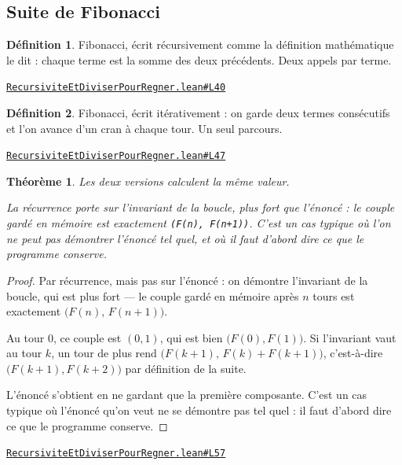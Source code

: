 \documentclass[11pt,a4paper]{article}
\theoremstyle{definition}
\newtheorem{definition}{Définition}
\theoremstyle{plain}
\newtheorem{theoreme}{Théorème}
\newcommand{\source}[2]{\par\smallskip\noindent\hfill{\footnotesize\href{#1}{\texttt{#2}}}\par\smallskip}
\begin{document}
\subsection{Suite de Fibonacci}

\begin{definition}
Fibonacci, écrit récursivement comme la définition mathématique le dit : chaque
terme est la somme des deux précédents. Deux appels par terme.
\end{definition}
\source{https://github.com/Commutator-IO/learn-lean/blob/main/courses/02-lycee/11-informatique-nsi/RecursiviteEtDiviserPourRegner.lean\#L40}{RecursiviteEtDiviserPourRegner.lean\#L40}

\begin{definition}
Fibonacci, écrit itérativement : on garde deux termes consécutifs et l'on avance
d'un cran à chaque tour. Un seul parcours.
\end{definition}
\source{https://github.com/Commutator-IO/learn-lean/blob/main/courses/02-lycee/11-informatique-nsi/RecursiviteEtDiviserPourRegner.lean\#L47}{RecursiviteEtDiviserPourRegner.lean\#L47}

\begin{theoreme}
Les deux versions calculent la même valeur.

La récurrence porte sur l'invariant de la boucle, plus fort que l'énoncé : le couple
gardé en mémoire est exactement \texttt{(F(n), F(n+1))}. C'est un cas typique où l'on ne
peut pas démontrer l'énoncé tel quel, et où il faut d'abord dire ce que le programme
conserve.
\end{theoreme}
\begin{proof}
Par récurrence, mais pas sur l'énoncé : on démontre l'invariant de la boucle, qui est
plus fort — le couple gardé en mémoire après \(n\) tours est exactement
\(\bigl(F(n),\, F(n+1)\bigr)\).

Au tour \(0\), ce couple est \((0, 1)\), qui est bien \(\bigl(F(0), F(1)\bigr)\). Si
l'invariant vaut au tour \(k\), un tour de plus rend
\(\bigl(F(k+1),\, F(k) + F(k+1)\bigr)\), c'est-à-dire \(\bigl(F(k+1), F(k+2)\bigr)\) par
définition de la suite.

L'énoncé s'obtient en ne gardant que la première composante. C'est un cas typique où
l'énoncé qu'on veut ne se démontre pas tel quel : il faut d'abord dire ce que le
programme conserve.
\end{proof}
\source{https://github.com/Commutator-IO/learn-lean/blob/main/courses/02-lycee/11-informatique-nsi/RecursiviteEtDiviserPourRegner.lean\#L57}{RecursiviteEtDiviserPourRegner.lean\#L57}
\end{document}
